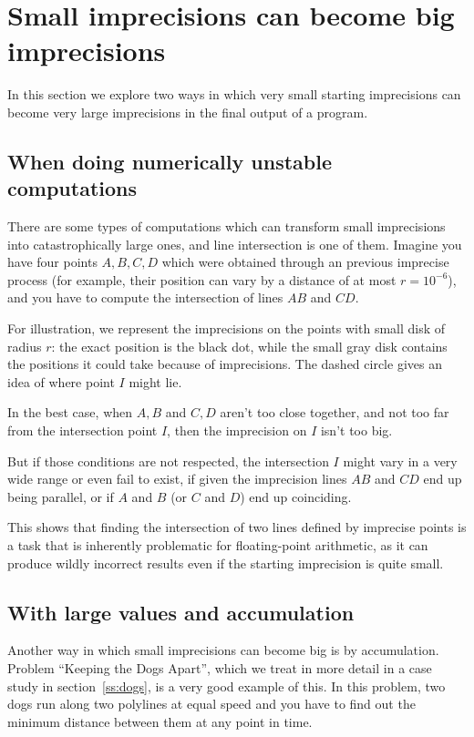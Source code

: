 \section{Small imprecisions can become big imprecisions}
In this section we explore two ways in which very small starting imprecisions can become very large imprecisions in the final output of a program.

\subsection{When doing numerically unstable computations}\label{ss:numerically-unstable}
There are some types of computations which can transform small imprecisions into catastrophically large ones, and line intersection is one of them. Imagine you have four points $A,B,C,D$ which were obtained through an previous imprecise process (for example, their position can vary by a distance of at most $r = 10^{-6}$), and you have to compute the intersection of lines $AB$ and $CD$.

For illustration, we represent the imprecisions on the points with small disk of radius $r$: the exact position is the black dot, while the small gray disk contains the positions it could take because of imprecisions. The dashed circle gives an idea of where point $I$ might lie.

In the best case, when $A,B$ and $C,D$ aren't too close together, and not too far from the intersection point $I$, then the imprecision on $I$ isn't too big.


But if those conditions are not respected, the intersection $I$ might vary in a very wide range or even fail to exist, if given the imprecision lines $AB$ and $CD$ end up being parallel, or if $A$ and $B$ (or $C$ and $D$) end up coinciding.

    
This shows that finding the intersection of two lines defined by imprecise points is a task that is inherently problematic for floating-point arithmetic, as it can produce wildly incorrect results even if the starting imprecision is quite small.

\subsection{With large values and accumulation}\label{ss:accumulation}

Another way in which small imprecisions can become big is by accumulation. Problem ``Keeping the Dogs Apart'', which we treat in more detail in a case study in section~\ref{ss:dogs}, is a very good example of this. In this problem, two dogs run along two polylines at equal speed and you have to find out the minimum distance between them at any point in time.

